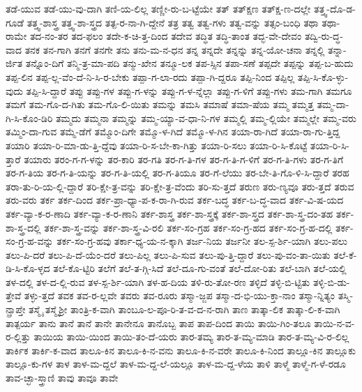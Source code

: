 {ತಡೆ-ಯುವ
ತಡೆ-ಯು-ವು-ದಾಗಿ
ತಣಿ-ಯ-ಲಿಲ್ಲ
ತಣ್ಣೀ-ರು-ಬ-ಟ್ಟೆಯೇ
ತತ್
ತತ್ಕ್ಷಣ
ತತ್ಕ್ಷ-ಣ-ದಲ್ಲೇ
ತತ್ತ್ವ-ದೊ-ಡ-ಗೂಡೆ
ತತ್ತ್ವ-ಶಾಸ್ತ್ರ
ತತ್ತ್ವ-ಶಾ-ಸ್ತ್ರದ
ತತ್ಪ-ರ-ನಾ-ಗಿ-ದ್ದೇನೆ
ತತ್ರ
ತತ್ವ
ತತ್ವ-ಗಳು
ತತ್ವ-ವನ್ನು
ತತ್ಸಂ-ಬಂಧಿ
ತಥಾ
ತಥಾ-ರಾಮೇ
ತದ-ನಂ-ತರ
ತದ-ಫಲಂ
ತದೇ-ಕ-ಚಿ-ತ್ತ-ದಿಂದ
ತದೇವ
ತದ್ಧಿತ
ತದ್ಧಿ-ತಾಂತ
ತದ್ಭ-ವೇ-ದೇವಂ
ತದ್ವಿ-ರು-ದ್ಧ-ವಾದ
ತನಕ
ತನ-ಗಾಗಿ
ತನಗೆ
ತನಗೇ
ತನು
ತನು-ಮ-ನ-ಧನ
ತನ್ನ
ತನ್ನದೇ
ತನ್ನನ್ನು
ತನ್ನ-ಯೋ-ಚನಾ
ತನ್ನಲ್ಲಿ
ತನ್ನಾ-ರ್ಜಿತ
ತನ್ನೊಂ-ದಿಗೆ
ತನ್ಮಿ-ತ್ರ-ಮಾ-ಪದಿ
ತನ್ಮು-ಖೇನ
ತನ್ಮೂ-ಲಕ
ತಪ-ಸ್ಸಿನ
ತಪಾ-ಸಣೆ
ತಪ್ಪದೇ
ತಪ್ಪನ್ನು
ತಪ್ಪ-ಬ-ಹುದು
ತಪ್ಪ-ಲಿನ
ತಪ್ಪ-ಲ್ಲ-ವೆಂ-ದೆ-ನಿ-ಸಿ-ರ-ಬೇಕು
ತಪ್ಪಾ-ಗ-ಲಾ-ರದು
ತಪ್ಪಾ-ಗಿ-ದ್ದರೂ
ತಪ್ಪಿ-ನಿಂದ
ತಪ್ಪಿಲ್ಲ
ತಪ್ಪಿ-ಸಿ-ಕೊ-ಳ್ಳು-ವುದು
ತಪ್ಪಿ-ಸಿ-ದ್ದಾರೆ
ತಪ್ಪು
ತಪ್ಪು-ಗಳ
ತಪ್ಪು-ಗ-ಳನ್ನು
ತಪ್ಪು-ಗ-ಳ-ನ್ನೆಲ್ಲಾ
ತಪ್ಪು-ಗ-ಳಿಗೆ
ತಪ್ಪು-ಗಳು
ತಮ-ಗಾಗಿ
ತಮಗೂ
ತಮಗೆ
ತಮ-ಗೊ-ದ-ಗಿತು
ತಮ-ಗೊ-ಲಿ-ಯಿತು
ತಮನ್ನು
ತಮಸಿ
ತಮಾಷೆ
ತಮಾ-ಷೆಯ
ತಮ್ಮ
ತಮ್ಮತ್ತ
ತಮ್ಮ-ದಾ-ಗಿ-ಸಿ-ಕೊಂ-ಡಿರಿ
ತಮ್ಮದು
ತಮ್ಮನಾ
ತಮ್ಮನ್ನು
ತಮ್ಮ-ಯ್ಯಾ-ವ-ಧಾ-ನಿ-ಗಳ
ತಮ್ಮಲ್ಲಿ
ತಮ್ಮ-ಲ್ಲಿಯೇ
ತಮ್ಮಲ್ಲೇ
ತಮ್ಮ-ವರು
ತಮ್ಮಿಂ-ದಾ-ಗುವ
ತಮ್ಮೆ-ಡೆಗೆ
ತಮ್ಮೊಂ-ದಿಗೇ
ತಮ್ಮೊ-ಳ-ಗಿದೆ
ತಮ್ಮೊ-ಳ-ಗಿನ
ತಯಾ-ರಾ-ಗಿದೆ
ತಯಾ-ರಾ-ಗು-ತ್ತಿದ್ದ
ತಯಾರಿ
ತಯಾ-ರಿ-ಮಾ-ಡು-ತ್ತಿ-ದ್ದೆವು
ತಯಾ-ರಿ-ಸ-ಬೇ-ಕಾ-ಗಿತ್ತು
ತಯಾ-ರಿ-ಸಲು
ತಯಾ-ರಿ-ಸಿ-ಕೊಟ್ಟೆ
ತಯಾ-ರಿ-ಸಿ-ತ್ತಾರೆ
ತಯಾರು
ತರಂ-ಗ-ಗ-ಳನ್ನು
ತರ-ಕಾರಿ
ತರ-ಗತಿ
ತರ-ಗ-ತಿ-ಗಳ
ತರ-ಗ-ತಿ-ಗ-ಳಿಗೆ
ತರ-ಗ-ತಿ-ಗಳು
ತರ-ಗ-ತಿಗೆ
ತರ-ಗ-ತಿಯ
ತರ-ಗ-ತಿ-ಯನ್ನು
ತರ-ಗ-ತಿ-ಯಲ್ಲಿ
ತರ-ಗ-ತಿಯೂ
ತರ-ಗೆ-ಲೆಯು
ತರ-ಬೇ-ತಿ-ಗೊ-ಳಿ-ಸಿ-ದ್ದಾರೆ
ತರಹ
ತರಾ-ತು-ರಿ-ಯ-ಲ್ಲಿ-ದ್ದಾರೆ
ತರಿ-ಕ್ಷೇ-ತ್ರ-ವನ್ನು
ತರಿ-ಕ್ಷೇ-ತ್ರ-ವೆಂದು
ತರಿ-ಸು-ತ್ತದೆ
ತರುಣ
ತರು-ಣ್ಯವೂ
ತರು-ತ್ತದೆ
ತರುವ
ತರು-ವರು
ತರ್ಕ
ತರ್ಕ-ದಿಂದ
ತರ್ಕ-ಪ್ರಾ-ಧ್ಯಾ-ಪ-ಕ-ರಾ-ಗಿ-ರುವ
ತರ್ಕ-ಬದ್ಧ
ತರ್ಕ-ಬ-ದ್ಧ-ವಾದ
ತರ್ಕ-ವಿ-ಷ-ಯದ
ತರ್ಕ-ವ್ಯಾ-ಕ-ರ-ಣಾದಿ
ತರ್ಕ-ವ್ಯಾ-ಕ-ರ-ಣಾನಿ
ತರ್ಕ-ಶಾಸ್ತ್ರ
ತರ್ಕ-ಶಾ-ಸ್ತ್ರಕ್ಕೆ
ತರ್ಕ-ಶಾ-ಸ್ತ್ರದ
ತರ್ಕ-ಶಾ-ಸ್ತ್ರ-ದಂ-ತಹ
ತರ್ಕ-ಶಾ-ಸ್ತ್ರ-ದಲ್ಲಿ
ತರ್ಕ-ಶಾ-ಸ್ತ್ರ-ವನ್ನು
ತರ್ಕ-ಶಾ-ಸ್ತ್ರ-ವಿ-ರಲಿ
ತರ್ಕ-ಸಂ-ಗ್ರಹ
ತರ್ಕ-ಸಂ-ಗ್ರ-ಹದ
ತರ್ಕ-ಸಂ-ಗ್ರ-ಹ-ದಲ್ಲಿ
ತರ್ಕ-ಸಂ-ಗ್ರ-ಹ-ವನ್ನು
ತರ್ಕ-ಸಂ-ಗ್ರ-ಹವು
ತರ್ಕಾ-ಧ್ಯ-ಯ-ನ-ಕ್ಕಾಗಿ
ತರ್ಜ-ನಿಯ
ತರ್ಜನೀ
ತಲ-ಸ್ಪ-ರ್ಶಿ-ಯಾಗಿ
ತಲು-ಪಲು
ತಲು-ಪಿ-ದರೆ
ತಲು-ಪಿ-ದೆ-ಯೆಂ-ದರೆ
ತಲು-ಪಿಲ್ಲ
ತಲು-ಪಿ-ಸುವ
ತಲು-ಪು-ತ್ತಿ-ದ್ದಾರೆ
ತಲು-ಪು-ವಂ-ತಾ-ಯಿತು
ತಲೆ-ಕೆ-ಡಿ-ಸಿ-ಕೊ-ಳ್ಳದ
ತಲೆ-ಕೊ-ಟ್ಟಿರಿ
ತಲೆಗೆ
ತಲೆ-ತ-ಗ್ಗಿ-ಸಿದೆ
ತಲೆ-ದೂ-ಗು-ವಂತೆ
ತಲೆ-ದೋ-ರಿತು
ತಲೆ-ಬಾಗಿ
ತಲೆ-ಯಲ್ಲಿ
ತಳ-ದಲ್ಲಿ
ತಳ-ದ-ಲ್ಲಿ-ರುವ
ತಳ-ಸ್ಪ-ರ್ಶಿ-ಯಾಗಿ
ತಳ-ಹ-ದಿಯ
ತಳಿ-ರು-ತೋ-ರಣ
ತಳ್ಳಿದೆ
ತಳ್ಳಿ-ಬಿ-ಟ್ಟಿತು
ತಳ್ಳಿ-ಬಿ-ಡು-ತ್ತೇವೆ
ತಳ್ಳು-ತ್ತದೆ
ತವಕ
ತವ-ರ-ಲ್ಲವೇ
ತವರು
ತವ-ರೂರು
ತಸ್ಮಾ-ಜ್ಜಪ
ತಸ್ಮಾ-ದ-ಭಿ-ಯು-ಕ್ತಾ-ನಾಂ
ತಸ್ಮಾ-ನ್ನಿತ್ಯಂ
ತಸ್ಮಿ-ನ್ಪ್ರಾಪ್ತೇ
ತಸ್ಮೈ
ತಸ್ಮೈಶ್ರೀ
ತಾಂತ್ರಿ-ಕ-ವಾಗಿ
ತಾಂಬೂ-ಲ-ಪೂ-ರಿ-ತ-ವ-ದ-ನ-ರಾಗಿ
ತಾಣ
ತಾತ್ಕಾ-ಲಿಕ
ತಾತ್ಕಾ-ಲಿ-ಕ-ವಾಗಿ
ತಾತ್ಪರ್ಯ
ತಾನು
ತಾನೆ
ತಾನೆ
ತಾನೇ
ತಾನೇನೂ
ತಾನೊಬ್ಬ
ತಾಪ
ತಾಪ-ದಿಂದ
ತಾಯಿ
ತಾಯಿ-ಗಿಂ-ತಲೂ
ತಾಯಿ-ನ-ವ-ರ-ಲ್ಲಿತ್ತು
ತಾಯಿಯ
ತಾಯಿ-ಯಿಂದ
ತಾಯಿ-ತಂ-ದೆ-ಯರು
ತಾರ-ತಮ್ಯ
ತಾರ-ತ-ಮ್ಯ-ಮಾಡಿ
ತಾರ-ತ-ಮ್ಯ-ವಿ-ರ-ಲಿಲ್ಲ
ತಾರ್ಕಿಕ
ತಾರ್ಕಿ-ಕ-ವಾದ
ತಾಲೂ-ಕಿನ
ತಾಲೂ-ಕಿ-ನ-ವನು
ತಾಲೂ-ಕಿ-ನ-ವರೇ
ತಾಲೂ-ಕಿ-ನಿಂದ
ತಾಲ್ಲೂ-ಕಿನ
ತಾಲ್ಲೂಕು
ತಾಲ್ಲೂ-ಕು-ಗಳ
ತಾಳ
ತಾಳ-ಮ-ದ್ದಲೆ
ತಾಳ-ಮ-ದ್ದ-ಲೆ-ಯಲ್ಲೂ
ತಾಳ-ಮ-ದ್ದ-ಳೆಯ
ತಾಳಿ
ತಾಳ್ಮೆ
ತಾಳ್ಮೆ-ಗ-ಳೆ-ರಡೂ
ತಾವ-ಚ್ಛಾ-ಸ್ತ್ರಾಣಿ
ತಾವು
ತಾವೂ
ತಾವೇ
}
